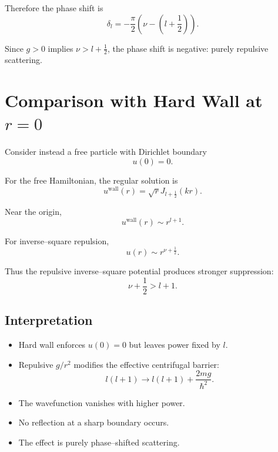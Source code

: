 \documentclass[11pt,a4paper]{article}
\begin{document}
Therefore the phase shift is
\begin{equation}
\boxed{
\delta_l
=
-\frac{\pi}{2}
\left(
\nu - \left(l+\frac{1}{2}\right)
\right).
}
\end{equation}

Since $g>0$ implies $\nu>l+\tfrac{1}{2}$,
the phase shift is negative: purely repulsive scattering.

\section{Comparison with Hard Wall at $r=0$}

Consider instead a free particle with Dirichlet boundary
\begin{equation}
u(0)=0.
\end{equation}

For the free Hamiltonian,
the regular solution is
\begin{equation}
u^{\text{wall}}(r)=\sqrt{r}J_{l+\frac{1}{2}}(kr).
\end{equation}

Near the origin,
\begin{equation}
u^{\text{wall}}(r)\sim r^{l+1}.
\end{equation}

For inverse–square repulsion,
\begin{equation}
u(r)\sim r^{\nu+\frac{1}{2}}.
\end{equation}

Thus the repulsive inverse–square potential
produces stronger suppression:
\begin{equation}
\nu+\frac{1}{2}
>
l+1.
\end{equation}

\subsection*{Interpretation}

\begin{itemize}
\item Hard wall enforces $u(0)=0$ but leaves power fixed by $l$.
\item Repulsive $g/r^2$ modifies the effective centrifugal barrier:
\begin{equation}
l(l+1)\longrightarrow l(l+1)+\frac{2mg}{\hbar^2}.
\end{equation}
\item The wavefunction vanishes with higher power.
\item No reflection at a sharp boundary occurs.
\item The effect is purely phase–shifted scattering.
\end{itemize}
\end{document}
